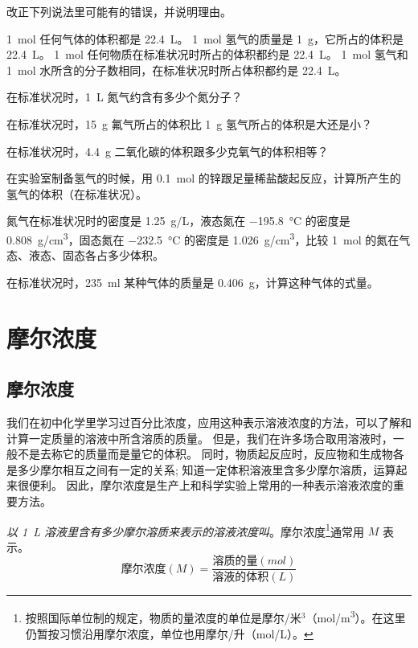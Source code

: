 \begin{Practice}[习题]
  \begin{question}
    \item 改正下列说法里可能有的错误，并说明理由。
    \begin{tasks}
      \task \qty{1}{mol} 任何气体的体积都是 \qty{22.4}{L}。
      \task \qty{1}{mol} 氢气的质量是 \qty{1}{g}，它所占的体积是 \qty{22.4}{L}。
      \task \qty{1}{mol} 任何物质在标准状况时所占的体积都约是 \qty{22.4}{L}。
      \task \qty{1}{mol} 氢气和 \qty{1}{mol} 水所含的分子数相同，在标准状况时所占体积都约是 \qty{22.4}{L}。
    \end{tasks}
    \item 在标准状况时，\qty{1}{L} 氮气约含有多少个氮分子？
    \item 在标准状况时，\qty{15}{g} 氟气所占的体积比 \qty{1}{g} 氢气所占的体积是大还是小？
    \item 在标准状况时，\qty{4.4}{g} 二氧化碳的体积跟多少克氧气的体积相等？
    \item 在实验室制备氢气的时候，用 \qty{0.1}{mol} 的锌跟足量稀盐酸起反应，计算所产生的氢气的体积（在标准状况）。
    \item 氮气在标准状况时的密度是 \qty{1.25}{g/L}，液态氮在 \qty{-195.8}{\celsius} 的密度是 \qty{0.808}{g/cm^3}，固态氮在  \qty{-232.5}{\celsius} 的密度是 \qty{1.026}{g/cm^3}，比较 \qty{1}{mol} 的氮在气态、液态、固态各占多少体积。
    \item 在标准状况时，\qty{235}{ml} 某种气体的质量是 \qty{0.406}{g}，计算这种气体的式量。
  \end{question}
\end{Practice}

\section{摩尔浓度}
\subsection{摩尔浓度}
我们在初中化学里学习过百分比浓度，应用这种表示溶液浓度的方法，可以了解和计算一定质量的溶液中所含溶质的质量。
但是，我们在许多场合取用溶液时，一般不是去称它的质量而是量它的体积。
同时，物质起反应时，反应物和生成物各是多少摩尔相互之间有一定的关系; 知道一定体积溶液里含多少摩尔溶质，运算起来很便利。
因此，摩尔浓度是生产上和科学实验上常用的一种表示溶液浓度的重要方法。

\emph{以 \qty{1}{L} 溶液里含有多少摩尔溶质来表示的溶液浓度叫}。摩尔浓度\footnote{按照国际单位制的规定，物质的量浓度的单位是摩尔/米$^3$（\unit{mol/m^3}）。在这里仍暂按习惯沿用摩尔浓度，单位也用摩尔/升（\unit{mol/L}）。}通常用 $M$ 表示。
\[
\text{摩尔浓度}(M) = \frac{\text{溶质的量}(\unit{mol})}{\text{溶液的体积}(\unit{L})}
\]

